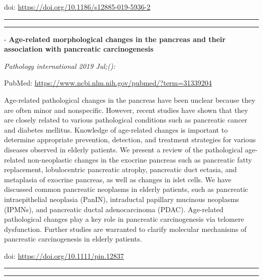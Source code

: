 \documentclass[]{article}
\begin{document}
doi: \url{https://doi.org/10.1186/s12885-019-5936-2}

{}

{}

\begin{center}\rule{0.5\linewidth}{\linethickness}\end{center}

\begin{center}\rule{0.5\linewidth}{\linethickness}\end{center}

 - \textbf{Age-related morphological changes in the pancreas and their
association with pancreatic carcinogenesis}

\emph{Pathology international 2019 Jul;():}

PubMed: \url{https://www.ncbi.nlm.nih.gov/pubmed/?term=31339204}

Age-related pathological changes in the pancreas have been unclear
because they are often minor and nonspecific. However, recent studies
have shown that they are closely related to various pathological
conditions such as pancreatic cancer and diabetes mellitus. Knowledge of
age-related changes is important to determine appropriate prevention,
detection, and treatment strategies for various diseases observed in
elderly patients. We present a review of the pathological age-related
non-neoplastic changes in the exocrine pancreas such as pancreatic fatty
replacement, lobulocentric pancreatic atrophy, pancreatic duct ectasia,
and metaplasia of exocrine pancreas, as well as changes in islet cells.
We have discussed common pancreatic neoplasms in elderly patients, such
as pancreatic intraepithelial neoplasia (PanIN), intraductal papillary
mucinous neoplasms (IPMNs), and pancreatic ductal adenocarcinoma (PDAC).
Age-related pathological changes play a key role in pancreatic
carcinogenesis via telomere dysfunction. Further studies are warranted
to clarify molecular mechanisms of pancreatic carcinogenesis in elderly
patients.

doi: \url{https://doi.org/10.1111/pin.12837}

{}

{}

\begin{center}\rule{0.5\linewidth}{\linethickness}\end{center}

\begin{center}\rule{0.5\linewidth}{\linethickness}\end{center}
\end{document}
